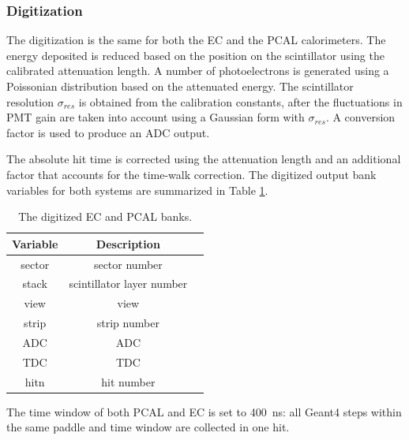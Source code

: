 \subsubsection{Digitization}
The digitization is the same for both the EC and the PCAL calorimeters.
The energy deposited is reduced based on the position on the scintillator using the calibrated attenuation length.
A number of photoelectrons is generated using a Poissonian distribution based on the attenuated energy.
The scintillator resolution $\sigma_{res}$ is obtained from the calibration constants, after the fluctuations in PMT gain
are taken into account using a Gaussian form with $\sigma_{res}$. A conversion factor is used to produce an ADC output.

The absolute hit time is corrected using the attenuation length and an additional factor that accounts for the time-walk correction.
The digitized output bank variables for both systems are summarized in Table \ref{tab:ecBank}.

\begin{table}[h]
	\begin{center}
		\begin{tabular}{| c | c | c |}
			\hline \hline
			Variable &                Description   \\
			\hline
             sector  &              sector number   \\
              stack  &  scintillator layer number   \\
               view  &                       view   \\
              strip  &               strip number   \\
                ADC  &                        ADC   \\
                TDC  &                        TDC   \\
               hitn  &                 hit number   \\
			\hline \hline
		\end{tabular}
	\end{center}
	\caption{The digitized EC and PCAL banks.}\label{tab:ecBank}
\end{table}


The time window of both PCAL and EC is set to 400~ns: all Geant4 steps within the same paddle and time window are collected in one hit.
